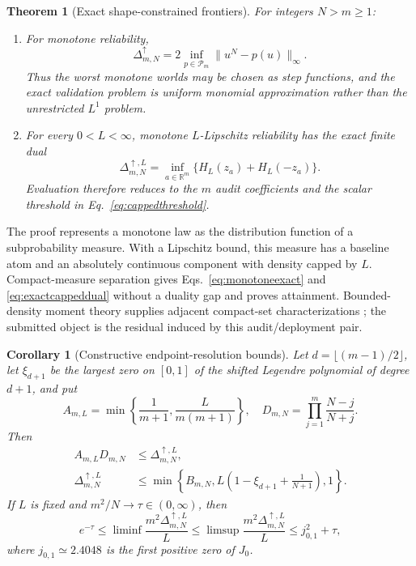 \documentclass[10pt,twocolumn]{article}
\newtheorem{theorem}{Theorem}
\newtheorem{corollary}{Corollary}
\newcommand{\cP}{\mathcal P}
\begin{document}
\begin{theorem}[Exact shape-constrained frontiers]
\label{thm:regularity}
For integers $N>m\ge1$:
\begin{enumerate}[label=(\roman*)]
\item For monotone reliability,
\begin{equation}
\Delta^{\uparrow}_{m,N}
=2\inf_{p\in\cP_m}\|u^N-p(u)\|_\infty.
\label{eq:monotoneexact}
\end{equation}
Thus the worst monotone worlds may be chosen as step functions, and the exact validation problem is uniform monomial approximation rather than the unrestricted $L^1$ problem.
\item For every $0<L<\infty$, monotone $L$-Lipschitz reliability has the exact finite dual
\begin{equation}
\Delta^{\uparrow,L}_{m,N}
=\inf_{a\in\mathbb R^m}\{H_L(z_a)+H_L(-z_a)\}.
\label{eq:exactcappeddual}
\end{equation}
Evaluation therefore reduces to the $m$ audit coefficients and the scalar threshold in Eq.~\ref{eq:cappedthreshold}.
\end{enumerate}
\end{theorem}

The proof represents a monotone law as the distribution function of a subprobability measure. With a Lipschitz bound, this measure has a baseline atom and an absolutely continuous component with density capped by $L$. Compact-measure separation gives Eqs.~\ref{eq:monotoneexact} and \ref{eq:exactcappeddual} without a duality gap and proves attainment. Bounded-density moment theory supplies adjacent compact-set characterizations \citep[Theorem~3(a--c), pp.~5--6]{lasserre2006}; the submitted object is the residual induced by this audit/deployment pair.

\begin{corollary}[Constructive endpoint-resolution bounds]
\label{cor:regularitybounds}
Let $d=\lfloor(m-1)/2\rfloor$, let $\xi_{d+1}$ be the largest zero on $[0,1]$ of the shifted Legendre polynomial of degree $d+1$, and put
\begin{equation}
A_{m,L}=\min\left\{\frac1{m+1},\frac{L}{m(m+1)}\right\},\quad
D_{m,N}=\prod_{j=1}^m\frac{N-j}{N+j}.
\label{eq:regularconstants}
\end{equation}
Then
\begin{equation}
\begin{aligned}
A_{m,L}D_{m,N}&\le\Delta^{\uparrow,L}_{m,N},\\
\Delta^{\uparrow,L}_{m,N}
&\le\min\left\{B_{m,N},
L\left(1-\xi_{d+1}+\frac1{N+1}\right),1\right\}.
\end{aligned}
\label{eq:regularbounds}
\end{equation}
If $L$ is fixed and $m^2/N\to\tau\in(0,\infty)$, then
\begin{equation}
e^{-\tau}\le\liminf\frac{m^2\Delta^{\uparrow,L}_{m,N}}L
\le\limsup\frac{m^2\Delta^{\uparrow,L}_{m,N}}L
\le j_{0,1}^2+\tau,
\label{eq:regularphase}
\end{equation}
where $j_{0,1}\simeq2.4048$ is the first positive zero of $J_0$.
\end{corollary}
\end{document}
